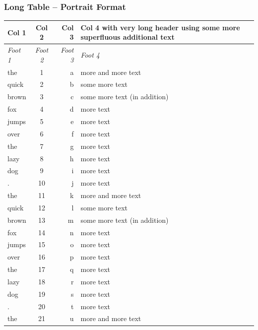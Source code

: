 \subsubsection{Long Table -- Portrait Format}\label{subsubsec:longtables}
\label{tab:longtable} %
\begin{tabularx}{\linewidth}{lcrX}
   \toprule
   \textbf{Col 1} &  \textbf{Col 2} &  \textbf{Col 3} & \textbf{Col 4 with very long header using some more
      superfluous additional text} \\\midrule\endhead
   \midrule
   \textit{Foot 1} & \textit{Foot 2} & \textit{Foot 3} & \textit{Foot 4} \\\bottomrule\endfoot
   the   & 1    & a     & more and more text \\ \midrule
   quick & 2     & b     & some more text \\ \midrule
   brown & 3     & c     & some more text (in addition) \\ \midrule
   fox   & 4     & d     & more text \\ \midrule
   jumps & 5     & e     & more text \\ \midrule
   over  & 6     & f     & more text \\ \midrule
   the   & 7     & g     & more text \\ \midrule
   lazy  & 8     & h     & more text \\ \midrule
   dog   & 9     & i     & more text \\ \midrule
   .     & 10    & j     & more text \\ \midrule
   the   & 11    & k     & more and more text \\ \midrule
   quick & 12    & l     & some more text \\ \midrule
   brown & 13    & m     & some more text (in addition) \\ \midrule
   fox   & 14    & n     & more text \\ \midrule
   jumps & 15    & o     & more text \\ \midrule
   over  & 16    & p     & more text \\ \midrule
   the   & 17    & q     & more text \\ \midrule
   lazy  & 18    & r     & more text \\ \midrule
   dog   & 19    & s     & more text \\ \midrule
   .     & 20    & t     & more text \\ \midrule
   the   & 21    & u     & more and more text \\ \midrule

\end{tabularx}
